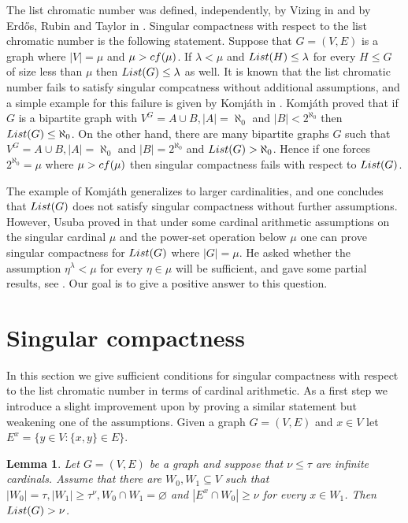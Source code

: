 \documentclass[11pt]{amsart}
\newtheorem{lemma}[theorem]{Lemma}
\theoremstyle{definition}
\theoremstyle{remark}
\newcommand{\cf}{{\rm cf}}
\begin{document}
The list chromatic number was defined, independently, by Vizing in \cite{MR498216} and by Erd\H{o}s, Rubin and Taylor in \cite{MR593902}.
Singular compactness with respect to the list chromatic number is the following statement.
Suppose that $G=(V,E)$ is a graph where $|V|=\mu$ and $\mu>\cf(\mu)$.
If $\lambda<\mu$ and ${\rm List}(H)\leq\lambda$ for every $H\leq G$ of size less than $\mu$ then ${\rm List}(G)\leq\lambda$ as well.
It is known that the list chromatic number fails to satisfy singular compcatness without additional assumptions, and a simple example for this failure is given by Komj\'{a}th in \cite{MR3096584}.
Komj\'{a}th proved that if $G$ is a bipartite graph with $V^G=A\cup B, |A|=\aleph_0$ and $|B|<2^{\aleph_0}$ then ${\rm List}(G)\leq\aleph_0$.
On the other hand, there are many bipartite graphs $G$ such that $V^G=A\cup B, |A|=\aleph_0$ and $|B|=2^{\aleph_0}$ and ${\rm List}(G)>\aleph_0$.
Hence if one forces $2^{\aleph_0}=\mu$ where $\mu>\cf(\mu)$ then singular compactness fails with respect to ${\rm List}(G)$.

The example of Komj\'{a}th generalizes to larger cardinalities, and one concludes that ${\rm List}(G)$ does not satisfy singular compactness without further assumptions.
However, Usuba proved in \cite{MR4732367} that under some cardinal arithmetic assumptions on the singular cardinal $\mu$ and the power-set operation below $\mu$ one can prove singular compactness for ${\rm List}(G)$ where $|G|=\mu$.
He asked whether the assumption $\eta^\lambda<\mu$ for every $\eta\in\mu$ will be sufficient, and gave some partial results, see \cite[Question 3.8]{MR4732367}.
Our goal is to give a positive answer to this question.

\newpage

\section{Singular compactness}

In this section we give sufficient conditions for singular compactness with respect to the list chromatic number in terms of cardinal arithmetic.
As a first step we introduce a slight improvement upon \cite[Fact 2.4]{MR4732367} by proving a similar statement but weakening one of the assumptions.
Given a graph $G=(V,E)$ and $x\in V$ let $E^x=\{y\in V:\{x,y\}\in E\}$.

\begin{lemma}
\label{lem2.4} Let $G=(V,E)$ be a graph and suppose that $\nu\leq\tau$ are infinite cardinals.
Assume that there are $W_0,W_1\subseteq V$ such that $|W_0|=\tau,|W_1|\geq\tau^\nu,W_0\cap W_1=\varnothing$ and $|E^x\cap W_0|\geq\nu$ for every $x\in W_1$.
Then ${\rm List}(G)>\nu$.
\end{lemma}
\end{document}
